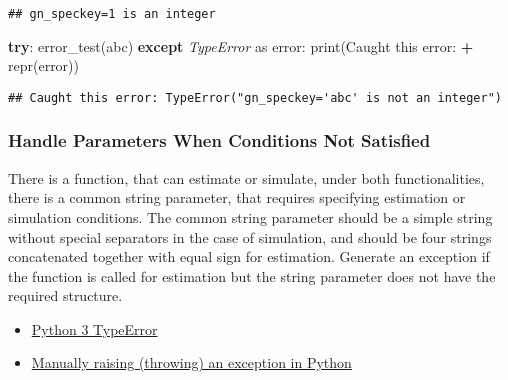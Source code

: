\documentclass[
]{book}
\newenvironment{Shaded}{\begin{snugshade}}{\end{snugshade}}
\newcommand{\BuiltInTok}[1]{#1}
\newcommand{\ControlFlowTok}[1]{\textcolor[rgb]{0.13,0.29,0.53}{\textbf{#1}}}
\newcommand{\ImportTok}[1]{#1}
\newcommand{\NormalTok}[1]{#1}
\newcommand{\OperatorTok}[1]{\textcolor[rgb]{0.81,0.36,0.00}{\textbf{#1}}}
\newcommand{\PreprocessorTok}[1]{\textcolor[rgb]{0.56,0.35,0.01}{\textit{#1}}}
\newcommand{\StringTok}[1]{\textcolor[rgb]{0.31,0.60,0.02}{#1}}
\providecommand{\tightlist}{%
  \setlength{\itemsep}{0pt}\setlength{\parskip}{0pt}}
\begin{document}
\begin{verbatim}
## gn_speckey=1 is an integer
\end{verbatim}

\begin{Shaded}
\begin{Highlighting}[]
\ControlFlowTok{try}\NormalTok{:}
\NormalTok{    error\_test(}\StringTok{\textquotesingle{}abc\textquotesingle{}}\NormalTok{)}
\ControlFlowTok{except} \PreprocessorTok{TypeError} \ImportTok{as}\NormalTok{ error:}
    \BuiltInTok{print}\NormalTok{(}\StringTok{\textquotesingle{}Caught this error: \textquotesingle{}} \OperatorTok{+} \BuiltInTok{repr}\NormalTok{(error))}
\end{Highlighting}
\end{Shaded}

\begin{verbatim}
## Caught this error: TypeError("gn_speckey='abc' is not an integer")
\end{verbatim}

\hypertarget{handle-parameters-when-conditions-not-satisfied}{%
\subsubsection{Handle Parameters When Conditions Not Satisfied}\label{handle-parameters-when-conditions-not-satisfied}}

There is a function, that can estimate or simulate, under both functionalities, there is a common string parameter, that requires specifying estimation or simulation conditions. The common string parameter should be a simple string without special separators in the case of simulation, and should be four strings concatenated together with equal sign for estimation. Generate an exception if the function is called for estimation but the string parameter does not have the required structure.

\begin{itemize}
\tightlist
\item
  \href{https://docs.python.org/3/library/exceptions.html\#TypeError}{Python 3 TypeError}
\item
  \href{https://stackoverflow.com/a/30317038/8280804}{Manually raising (throwing) an exception in Python}
\end{itemize}
\end{document}
